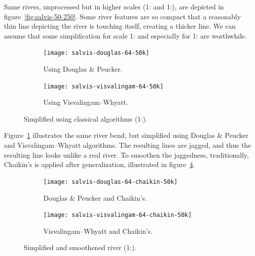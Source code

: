 \documentclass[a4paper]{article}
\newcommand{\DP}{Douglas \& Peucker}
\newcommand{\VW}{Visvalingam--Whyatt}
\begin{document}
Same rivers, unprocessed but in higher scales (1: and
1:), are depicted in figure~\ref{fig:salvis-50-250}. Some
river features are so compact that a reasonably thin line depicting the river
is touching itself, creating a thicker line. We can assume that some
simplification for scale 1: and especially for
1: are worthwhile.

\begin{figure}[ht]
    \centering
    \begin{subfigure}[b]{.49\textwidth}
        \texttt{[image: salvis-douglas-64-50k]}
        \caption{Using {\DP}.}
    \end{subfigure}
    \hfill
    \begin{subfigure}[b]{.49\textwidth}
        \texttt{[image: salvis-visvalingam-64-50k]}
        \caption{Using {\VW}.}
    \end{subfigure}
    \caption{Simplified using classical algorithms (1:).}
    \label{fig:salvis-generalized-50k}
\end{figure}

Figure~\ref{fig:salvis-generalized-50k} illustrates the same river bend, but
simplified using {\DP} and {\VW} algorithms. The resulting lines are jagged,
and thus the resulting line looks unlike a real river. To smoothen the jaggedness,
traditionally, Chaikin's\cite{chaikin1974algorithm} is applied after
generalization, illustrated in figure~\ref{fig:salvis-generalized-chaikin-50k}.

\begin{figure}[ht!]
    \centering
    \begin{subfigure}[b]{.49\textwidth}
        \texttt{[image: salvis-douglas-64-chaikin-50k]}
        \caption{{\DP} and Chaikin's.}
        \label{fig:salvis-douglas-64-chaikin-50k}
    \end{subfigure}
    \hfill
    \begin{subfigure}[b]{.49\textwidth}
        \texttt{[image: salvis-visvalingam-64-chaikin-50k]}
        \caption{{\VW} and Chaikin's.}
        \label{fig:salvis-visvalingam-64-chaikin-50k}
    \end{subfigure}
    \caption{Simplified and smoothened river (1:).}
    \label{fig:salvis-generalized-chaikin-50k}
\end{figure}
\end{document}
